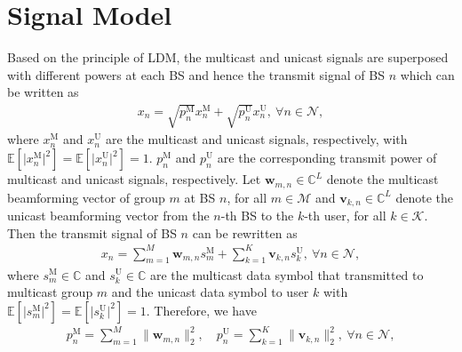 \documentclass[12pt, draftclsnofoot, onecolumn]{IEEEtran}
\begin{document}
\section{Signal Model}
Based on the principle of LDM, the multicast and unicast signals are superposed with different powers at each BS and hence the transmit signal of BS $n$ which can be written as
\begin{align}
x_{n} = \sqrt{p_{n}^{\text{M}}} x_{n}^{\text{M}} + \sqrt{p_{n}^{\text{U}}} x_{n}^{\text{U}},~\forall n \in \mathcal{N},
\end{align}
where $x_{n}^{\text{M}}$ and $x_{n}^{\text{U}}$ are the multicast and unicast signals, respectively, with $\mathbb{E} \left[ \lvert x_{n}^{\text{M}} \rvert^2 \right] = \mathbb{E} \left[ \lvert x_{n}^{\text{U}} \rvert^2 \right] = 1$. $p_{n}^{\text{M}}$ and $p_{n}^{\text{U}}$ are the corresponding transmit power of multicast and unicast signals, respectively. Let $\mathbf{w}_{m,n} \in \mathbb{C}^{L}$ denote the multicast beamforming vector of group $m$ at BS $n$, for all $ m \in \mathcal{M}$ and $\mathbf{v}_{k,n} \in \mathbb{C}^{L}$ denote the unicast beamforming vector from the $n$-th BS to the $k$-th user, for all $k \in \mathcal{K}$. Then the transmit signal of BS $n$ can be rewritten as 
\begin{align}
x_{n} = \sum_{m=1}^M \mathbf{w}_{m,n} s_{m}^{\text{M}} + \sum_{k=1}^K \mathbf{v}_{k,n} s_{k}^{\text{U}},~\forall n \in \mathcal{N},
\end{align}
where $s_{m}^{\text{M}} \in \mathbb{C}$ and $s_{k}^{\text{U}} \in \mathbb{C}$ are the multicast data symbol that transmitted to multicast group $m$ and the unicast data symbol to user $k$ with $\mathbb{E} \left[ \lvert s_{m}^{\text{M}} \rvert^2 \right] = \mathbb{E} \left[ \lvert s_{k}^{\text{U}} \rvert^2 \right] = 1$. Therefore, we have
\begin{align}
p_{n}^{\text{M}} = \sum_{m=1}^M \lVert \mathbf{w}_{m,n} \rVert_2^2, \quad
p_{n}^{\text{U}} = \sum_{k=1}^K \lVert \mathbf{v}_{k,n} \rVert_2^2,~\forall n \in \mathcal{N},
\end{align}
\end{document}
